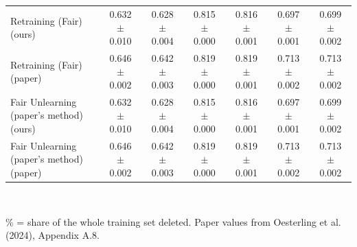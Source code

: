 \begin{table}[t]
\begin{tabular}{lcccccc}
Retraining (Fair) (ours) & 0.632 $\pm$ 0.010 & 0.628 $\pm$ 0.004 & 0.815 $\pm$ 0.000 & 0.816 $\pm$ 0.001 & 0.697 $\pm$ 0.001 & 0.699 $\pm$ 0.002 \\
Retraining (Fair) (paper) & 0.646 $\pm$ 0.002 & 0.642 $\pm$ 0.003 & 0.819 $\pm$ 0.000 & 0.819 $\pm$ 0.001 & 0.713 $\pm$ 0.002 & 0.713 $\pm$ 0.002 \\
Fair Unlearning (paper's method) (ours) & 0.632 $\pm$ 0.010 & 0.628 $\pm$ 0.004 & 0.815 $\pm$ 0.000 & 0.816 $\pm$ 0.001 & 0.697 $\pm$ 0.001 & 0.699 $\pm$ 0.002 \\
Fair Unlearning (paper's method) (paper) & 0.646 $\pm$ 0.002 & 0.642 $\pm$ 0.003 & 0.819 $\pm$ 0.000 & 0.819 $\pm$ 0.001 & 0.713 $\pm$ 0.002 & 0.713 $\pm$ 0.002 \\
\hline
\end{tabular}
\\[2pt]\parbox{\textwidth}{\footnotesize \% = share of the whole training set deleted. Paper values from Oesterling et al. (2024), Appendix A.8.}
\end{table}
